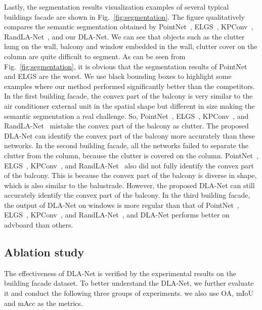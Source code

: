 \documentclass[review]{elsarticle}
\begin{document}
Lastly, the segmentation results visualization examples of several typical buildings facade are shown in Fig.~\ref{fig:segmentation}.
The figure qualitatively compares the semantic segmentation obtained by PointNet~\cite{qi2017pointnet}, ELGS~\cite{wang2019exploiting}, KPConv~\cite{thomas2019kpconv}, RandLA-Net~\cite{hu2020randla}, and our DLA-Net.
We can see that objects such as the clutter hung on the wall, balcony and window embedded in the wall, clutter cover on the column are quite difficult to segment.
As can be seen from Fig.~\ref{fig:segmentation}, it is obvious that the segmentation results of PointNet and ELGS are the worst.
 We use black bounding boxes to highlight some examples where our method performed significantly better than the competitors. In the first building facade, the convex part of the balcony is very similar to the air conditioner external unit in the spatial shape but different in size making the semantic segmentation a real challenge. So, PointNet~\cite{qi2017pointnet}, ELGS~\cite{wang2019exploiting}, KPConv~\cite{thomas2019kpconv}, and RandLA-Net~\cite{hu2020randla} mistake the convex part of the balcony as clutter. The proposed DLA-Net can identify the convex part of the balcony more accurately than these networks. In the second building facade, all the networks failed to separate the clutter from the column, because the clutter is covered on the column. PointNet~\cite{qi2017pointnet}, ELGS~\cite{wang2019exploiting}, KPConv~\cite{thomas2019kpconv}, and RandLA-Net~\cite{hu2020randla} also did not fully identify the convex part of the balcony. This is because the convex part of the balcony is diverse in shape, which is also similar to the balustrade. However, the proposed DLA-Net can still accurately identify the convex part of the balcony. In the third building facade, the output of DLA-Net on windows is more regular than that of PointNet~\cite{qi2017pointnet}, ELGS~\cite{wang2019exploiting}, KPConv~\cite{thomas2019kpconv}, and RandLA-Net~\cite{hu2020randla}, and DLA-Net performs better on advboard than others.


\subsection{\textbf{Ablation study}}
The effectiveness of DLA-Net is verified by the experimental results on the building facade dataset. To better understand the DLA-Net, we further evaluate it and conduct the following three groups of experiments. we also use OA, mIoU and mAcc as the metrics.
\end{document}
